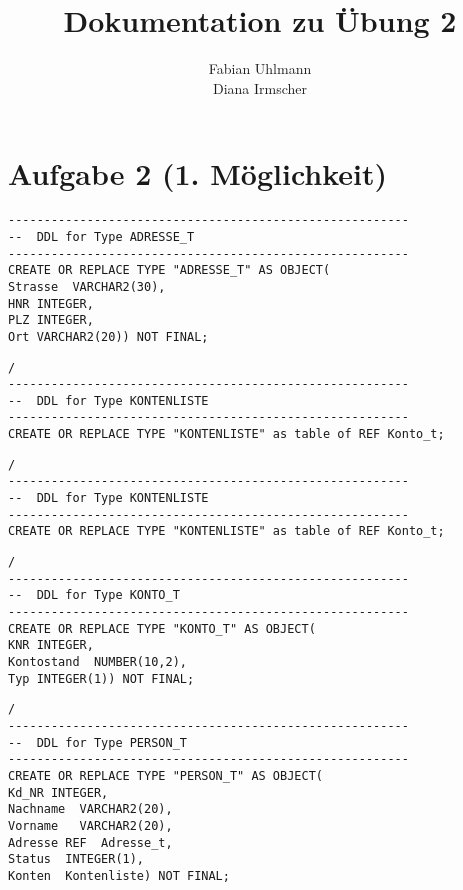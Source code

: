 \documentclass{scrartcl}
\begin{document}
\begin{titlepage}
\titlehead{Hochschule München, Fakultät 07, SoSe 2016}
\subject{Datenbanken 2}
\title{Dokumentation zu Übung 2}
\subtitle{}
\author{Fabian Uhlmann \\Diana Irmscher}
\end{titlepage}

\maketitle

\section*{Aufgabe 2 (1. Möglichkeit)}
\begin{lstlisting}
--------------------------------------------------------
--  DDL for Type ADRESSE_T
--------------------------------------------------------
CREATE OR REPLACE TYPE "ADRESSE_T" AS OBJECT(
Strasse  VARCHAR2(30),
HNR INTEGER,
PLZ INTEGER,
Ort VARCHAR2(20)) NOT FINAL;
\end{lstlisting}
\begin{lstlisting}
/
--------------------------------------------------------
--  DDL for Type KONTENLISTE
--------------------------------------------------------
CREATE OR REPLACE TYPE "KONTENLISTE" as table of REF Konto_t;
\end{lstlisting}
\begin{lstlisting}
/
--------------------------------------------------------
--  DDL for Type KONTENLISTE
--------------------------------------------------------
CREATE OR REPLACE TYPE "KONTENLISTE" as table of REF Konto_t;
\end{lstlisting}
\begin{lstlisting}
/
--------------------------------------------------------
--  DDL for Type KONTO_T
--------------------------------------------------------
CREATE OR REPLACE TYPE "KONTO_T" AS OBJECT(
KNR INTEGER,
Kontostand  NUMBER(10,2),
Typ INTEGER(1)) NOT FINAL;
\end{lstlisting}
\begin{lstlisting}
/
--------------------------------------------------------
--  DDL for Type PERSON_T
--------------------------------------------------------
CREATE OR REPLACE TYPE "PERSON_T" AS OBJECT(
Kd_NR INTEGER,
Nachname  VARCHAR2(20),
Vorname   VARCHAR2(20),
Adresse REF  Adresse_t,
Status  INTEGER(1),
Konten  Kontenliste) NOT FINAL;
\end{lstlisting}
\end{document}
